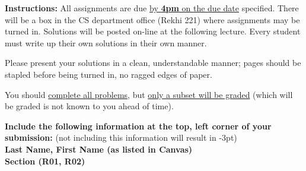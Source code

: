 


\extrawidth{0.5in} \extrafootheight{-0in} \pagestyle{headandfoot}
\headrule {} \footrule {}

\ifprintanswers
\else
\noindent \textbf{Instructions:} All assignments are due \underline{by \textbf{4pm} on the due date} specified.  There will be a box in the CS department office (Rekhi 221) where assignments may be turned in.  Solutions will be posted on-line at the following lecture.  Every student
must write up their own solutions in their own manner.

\medskip
\noindent Please present your solutions in a clean, understandable
manner; pages should be stapled before being turned in, no ragged edges of
paper.


\medskip
\noindent You should \underline{complete all problems}, but \underline{only a subset will be graded} (which will be graded is not known to you ahead of time). 

\medskip
\noindent \textbf{Include the following information at the top, left corner of your submission:} (not including this information will result in -3pt)\\
\textbf{Last Name, First Name (as listed in Canvas)} \\
\textbf{Section (R01, R02)}
\fi

